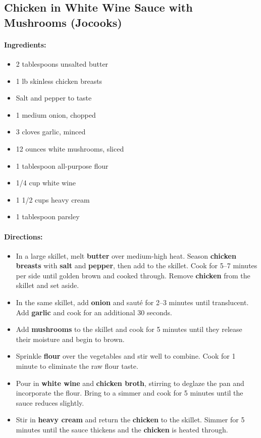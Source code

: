 \documentclass{article}
\begin{document}
\subsection{Chicken in White Wine Sauce with Mushrooms (Jocooks)}

\paragraph{Ingredients:}
\begin{itemize}
    \item 2 tablespoons unsalted butter
    \item 1 lb skinless chicken breasts
    \item Salt and pepper to taste
    \item 1 medium onion, chopped
    \item 3 cloves garlic, minced
    \item 12 ounces white mushrooms, sliced
    \item 1 tablespoon all-purpose flour
    \item 1/4 cup white wine
    \item 1 1/2 cups heavy cream
    \item 1 tablespoon parsley
\end{itemize}

\paragraph{Directions:}
\begin{itemize}
    \item In a large skillet, melt \textbf{butter} over medium-high heat. Season \textbf{chicken breasts} with \textbf{salt} and \textbf{pepper}, then add to the skillet. Cook for 5–7 minutes per side until golden brown and cooked through. Remove \textbf{chicken} from the skillet and set aside.
    \item In the same skillet, add \textbf{onion} and sauté for 2–3 minutes until translucent. Add \textbf{garlic} and cook for an additional 30 seconds.
    \item Add \textbf{mushrooms} to the skillet and cook for 5 minutes until they release their moisture and begin to brown.
    \item Sprinkle \textbf{flour} over the vegetables and stir well to combine. Cook for 1 minute to eliminate the raw flour taste.
    \item Pour in \textbf{white wine} and \textbf{chicken broth}, stirring to deglaze the pan and incorporate the flour. Bring to a simmer and cook for 5 minutes until the sauce reduces slightly.
    \item Stir in \textbf{heavy cream} and return the \textbf{chicken} to the skillet. Simmer for 5 minutes until the sauce thickens and the \textbf{chicken} is heated through.
\end{itemize}
\end{document}
